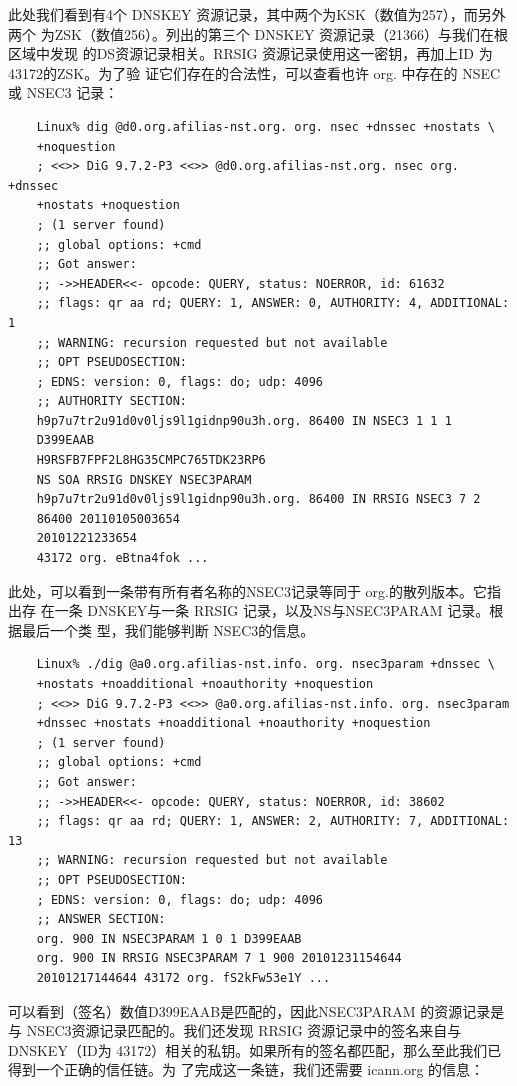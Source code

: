 此处我们看到有4个 DNSKEY 资源记录，其中两个为KSK（数值为257），而另外两个
为ZSK（数值256）。列出的第三个 DNSKEY 资源记录（21366）与我们在根区域中发现
的DS资源记录相关。RRSIG 资源记录使用这一密钥，再加上ID 为43172的ZSK。为了验
证它们存在的合法性，可以查看也许 org. 中存在的 NSEC或 NSEC3 记录：
\begin{verbatim}
    Linux% dig @d0.org.afilias-nst.org. org. nsec +dnssec +nostats \
    +noquestion
    ; <<>> DiG 9.7.2-P3 <<>> @d0.org.afilias-nst.org. nsec org. +dnssec
    +nostats +noquestion
    ; (1 server found)
    ;; global options: +cmd
    ;; Got answer:
    ;; ->>HEADER<<- opcode: QUERY, status: NOERROR, id: 61632
    ;; flags: qr aa rd; QUERY: 1, ANSWER: 0, AUTHORITY: 4, ADDITIONAL: 1
    ;; WARNING: recursion requested but not available
    ;; OPT PSEUDOSECTION:
    ; EDNS: version: 0, flags: do; udp: 4096
    ;; AUTHORITY SECTION:
    h9p7u7tr2u91d0v0ljs9l1gidnp90u3h.org. 86400 IN NSEC3 1 1 1
    D399EAAB
    H9RSFB7FPF2L8HG35CMPC765TDK23RP6
    NS SOA RRSIG DNSKEY NSEC3PARAM
    h9p7u7tr2u91d0v0ljs9l1gidnp90u3h.org. 86400 IN RRSIG NSEC3 7 2
    86400 20110105003654
    20101221233654
    43172 org. eBtna4fok ...
\end{verbatim}
此处，可以看到一条带有所有者名称的NSEC3记录等同于 org.的散列版本。它指出存
在一条 DNSKEY与一条 RRSIG 记录，以及NS与NSEC3PARAM 记录。根据最后一个类
型，我们能够判断 NSEC3的信息。
\begin{verbatim}
    Linux% ./dig @a0.org.afilias-nst.info. org. nsec3param +dnssec \
    +nostats +noadditional +noauthority +noquestion
    ; <<>> DiG 9.7.2-P3 <<>> @a0.org.afilias-nst.info. org. nsec3param
    +dnssec +nostats +noadditional +noauthority +noquestion
    ; (1 server found)
    ;; global options: +cmd
    ;; Got answer:
    ;; ->>HEADER<<- opcode: QUERY, status: NOERROR, id: 38602
    ;; flags: qr aa rd; QUERY: 1, ANSWER: 2, AUTHORITY: 7, ADDITIONAL: 13
    ;; WARNING: recursion requested but not available
    ;; OPT PSEUDOSECTION:
    ; EDNS: version: 0, flags: do; udp: 4096
    ;; ANSWER SECTION:
    org. 900 IN NSEC3PARAM 1 0 1 D399EAAB
    org. 900 IN RRSIG NSEC3PARAM 7 1 900 20101231154644
    20101217144644 43172 org. fS2kFw53e1Y ...
\end{verbatim}
可以看到（签名）数值D399EAAB是匹配的，因此NSEC3PARAM 的资源记录是与
NSEC3资源记录匹配的。我们还发现 RRSIG 资源记录中的签名来自与DNSKEY（ID为
43172）相关的私钥。如果所有的签名都匹配，那么至此我们已得到一个正确的信任链。为
了完成这一条链，我们还需要 icann.org 的信息：
